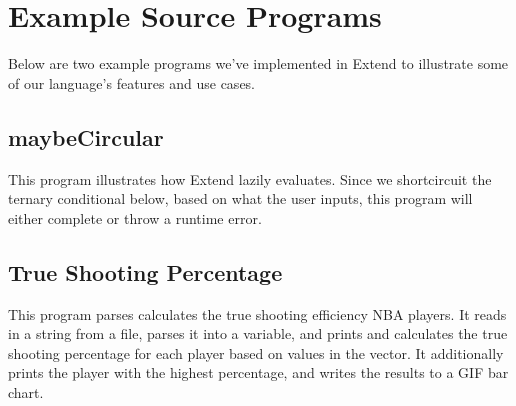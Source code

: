 \chapter{Example Source Programs}
Below are two example programs we've implemented in Extend to illustrate some of our language's features and use cases.

\section{maybeCircular}
  This program illustrates how Extend lazily evaluates. Since we shortcircuit the ternary conditional below, based on what the user inputs, this program will either complete or throw a runtime error.
  

\section{True Shooting Percentage}
  This program parses calculates the true shooting efficiency NBA players. It reads in a string from a file, parses it into a variable, and prints and calculates the true shooting percentage for each player based on values in the vector. It additionally prints the player with the highest percentage, and writes the results to a GIF bar chart.
  
